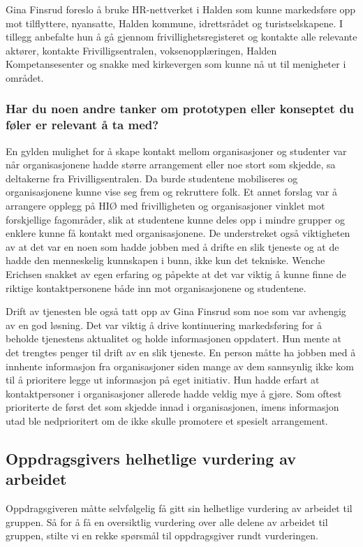 Gina Finsrud foreslo å bruke HR-nettverket i Halden som kunne markedsføre opp mot tilflyttere, nyansatte, Halden kommune, idrettsrådet og turistselskapene. I tillegg anbefalte hun å gå gjennom frivillighetsregisteret og kontakte alle relevante aktører, kontakte Frivilligsentralen, voksenopplæringen, Halden Kompetansesenter og snakke med kirkevergen som kunne nå ut til menigheter i området. \cite{KOMMUNEN-INTERVJU:20}

\subsubsection{Har du noen andre tanker om prototypen eller konseptet du føler er relevant å ta med?}
En gylden mulighet for å skape kontakt mellom organisasjoner og studenter var når organisasjonene hadde større arrangement eller noe stort som skjedde, sa deltakerne fra Frivilligsentralen. Da burde studentene mobiliseres og organisasjonene kunne vise seg frem og rekruttere folk. Et annet forslag var å arrangere opplegg på HIØ med frivilligheten og organisasjoner vinklet mot forskjellige fagområder, slik at studentene kunne deles opp i mindre grupper og enklere kunne få kontakt med organisasjonene. De understreket også viktigheten av at det var en noen som hadde jobben med å drifte en slik tjeneste og at de hadde den menneskelig kunnskapen i bunn, ikke kun det tekniske. Wenche Erichsen snakket av egen erfaring og påpekte at det var viktig å kunne finne de riktige kontaktpersonene både inn mot organisasjonene og studentene. \cite{FRIVILLIGSENTRALEN-INTERVJU:21}

Drift av tjenesten ble også tatt opp av Gina Finsrud som noe som var avhengig av en god løsning. Det var viktig å drive kontinuering markedsføring for å beholde tjenestens aktualitet og holde informasjonen oppdatert. Hun mente at det trengtes penger til drift av en slik tjeneste. En person måtte ha jobben med å innhente informasjon fra organisasjoner siden mange av dem sannsynlig ikke kom til å prioritere legge ut informasjon på eget initiativ. Hun hadde erfart at kontaktpersoner i organisasjoner allerede hadde veldig mye å gjøre. Som oftest prioriterte de først det som skjedde innad i organisasjonen, imens informasjon utad ble nedprioritert om de ikke skulle promotere et spesielt arrangement. \cite{KOMMUNEN-INTERVJU:20}

\subsection{Oppdragsgivers helhetlige vurdering av arbeidet}
Oppdragsgiveren måtte selvfølgelig få gitt sin helhetlige vurdering av arbeidet til gruppen. Så for å få en oversiktlig vurdering over alle delene av arbeidet til gruppen, stilte vi en rekke spørsmål til oppdragsgiver rundt vurderingen. 

